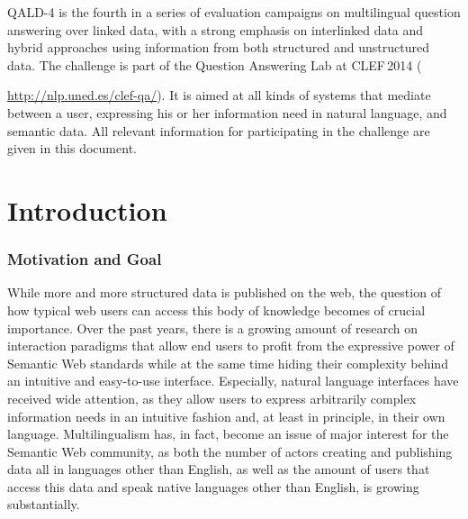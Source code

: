 \documentclass[a4paper]{article}
\begin{document}
QALD-4 is the fourth in a series of evaluation campaigns on multilingual question answering over linked data, 
with a strong emphasis on interlinked data and hybrid approaches using information from both structured and unstructured data. 
The challenge is part of the Question Answering Lab at CLEF\,2014 ({\url{http://nlp.uned.es/clef-qa/}). 
It is aimed at all kinds of systems that mediate between a user, expressing his or her information need in natural language, and semantic data. 
All relevant information for participating in the challenge are given in this document. 

\vspace{-1.4cm}

\tableofcontents

\newpage

\section{Introduction}

\subsubsection*{Motivation and Goal} 

While more and more structured data is published on the web, the question of how typical web users can access this body of knowledge becomes of crucial importance. Over the past years, there is a growing amount of research on interaction paradigms that allow end users to profit from the expressive power of Semantic Web standards while at the same time hiding their complexity behind an intuitive and easy-to-use interface. Especially, natural language interfaces have received wide attention, as they allow users to express arbitrarily complex information needs in an intuitive fashion and, at least in principle, in their own language. Multilingualism has, in fact, become an issue of major interest for the Semantic Web community, as both the number of actors creating and publishing data all in languages other than English, as well as the amount of users that access this data and speak native languages other than English, is growing substantially.

}
\end{document}
